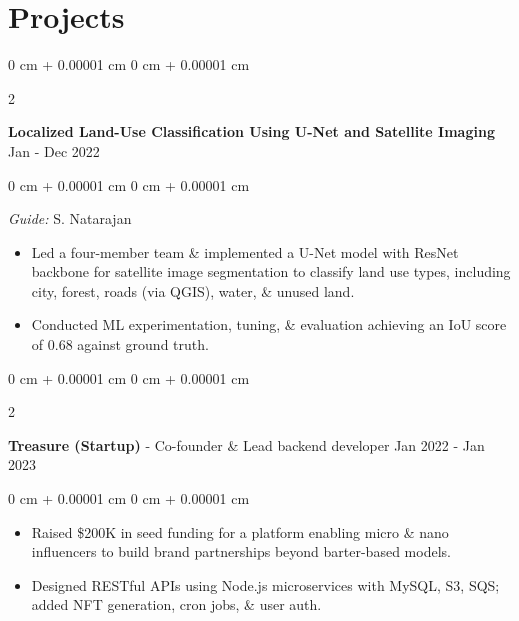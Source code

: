 \documentclass[10pt, a4paper]{article}
\newenvironment{highlights}{
    \begin{itemize}[
        topsep=0.10 cm,
        parsep=0.10 cm,
        partopsep=0pt,
        itemsep=0pt,
        leftmargin=0 cm + 10pt
    ]
}{
    \end{itemize}
} %
\newenvironment{onecolentry}{
    \begin{adjustwidth}{
        0 cm + 0.00001 cm
    }{
        0 cm + 0.00001 cm
    }
}{
    \end{adjustwidth}
} %
\newenvironment{twocolentry}[2][]{
    \onecolentry
    \def\secondColumn{#2}
    \setcolumnwidth{\fill, 6.0 cm}
    \begin{paracol}{2}
}{
    \switchcolumn \raggedleft \secondColumn
    \end{paracol}
    \endonecolentry
} %
\begin{document}
    \section{Projects}
        
        \begin{twocolentry}{
            Jan - Dec 2022
        }
            \textbf{Localized Land-Use Classification Using U-Net and Satellite Imaging}\end{twocolentry}

        \vspace{0.10 cm}
        \begin{onecolentry}
            \textit{Guide:} S. Natarajan\\
            \begin{highlights}
                \item Led a four-member team \& implemented a U-Net model with ResNet backbone for satellite image segmentation to classify land use types, including city, forest, roads (via QGIS), water, \& unused land.
                \item Conducted ML experimentation, tuning, \& evaluation achieving an IoU score of 0.68 against ground truth.
            \end{highlights}
        \end{onecolentry}


        \vspace{0.15 cm}

        \begin{twocolentry}{
            Jan 2022 - Jan 2023
        }
            \textbf{Treasure (Startup)} - Co-founder \& Lead backend developer\end{twocolentry}

        \vspace{0.10 cm}
        \begin{onecolentry}
            \begin{highlights}
                \item Raised \$200K in seed funding for a platform enabling micro \& nano influencers to build brand partnerships beyond barter-based models.
                \item Designed RESTful APIs using Node.js microservices with MySQL, S3, SQS; added NFT generation, cron jobs, \& user auth. 
            \end{highlights}
        \end{onecolentry}


        \vspace{0.15 cm}
\end{document}
